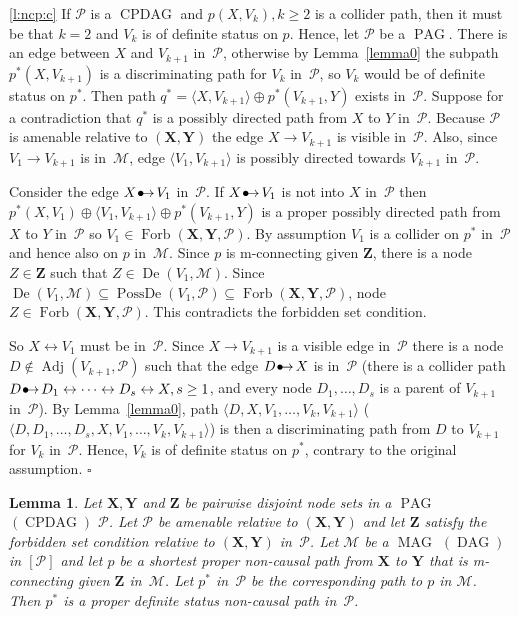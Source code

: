 \documentclass[11pt,a4paper]{article}
\newtheorem{lemma}[definition]{Lemma}
\newenvironment{proofof}[1][]{\begin{trivlist}
   \item[\hskip \labelsep {\bfseries Proof of #1.}]}{\hfill{}$\square$\end{trivlist}}
\DeclareMathOperator{\CPDAG}{CPDAG}
\DeclareMathOperator{\DAG}{DAG}
\DeclareMathOperator{\MAG}{MAG}
\DeclareMathOperator{\PAG}{PAG}
\DeclareMathOperator{\PossDe}{PossDe}
\DeclareMathOperator{\De}{De}
\DeclareMathOperator{\Adj}{Adj}
\DeclareMathOperator{\Forbi}{Forb}
\newcommand{\forb}{the forbidden set condition\xspace}
\newcommand{\g}[1][G]{\mathcal{#1}}
\newcommand{\fb}[2][X,Y]{\Forbi(\mathbf{#1},#2)}%
\newcommand{\pstar}[1][p]{{#1}^{*}}
\newcommand{\bulletarrow}{
  \setlength{\unitlength}{1mm}
  \begin{picture}(5,1)(0,0)
    \put(0.2,0){$\bullet$}
    \put(1,0){$\rightarrow$}
  \end{picture}
}
\begin{document}
\begin{proofof}[Lemma~\ref{lemma:non-causal path}]
\ref{l:ncp:c}  If $\g[P]$ is a $\CPDAG$ and $p(X,V_k), k \ge 2$ is a collider path, then it must be that $k=2$ and $V_k$ is of definite status on $p$. Hence, let $\g[P]$ be a $\PAG$. There is an edge between $X$ and $V_{k+1}$ in~$\g[P]$, otherwise by Lemma~\ref{lemma0} the subpath $\pstar(X,V_{k+1})$ is a discriminating path for $V_k$ in~$\g[P]$, so $V_k$ would be of definite status on $\pstar$. Then path $\pstar[q] = \langle X,V_{k+1} \rangle \oplus \pstar(V_{k+1},Y)$ exists in~$\g[P]$. 
Suppose for a contradiction that $\pstar[q]$ is a possibly directed path from $X$ to $Y$ in~$\g[P]$. Because $\g[P]$ is amenable relative to $(\mathbf{X,Y})$ the edge $X \rightarrow V_{k+1}$ is visible in~$\g[P]$. Also, since $V_1 \rightarrow V_{k+1}$ is in~$\g[M]$, edge $\langle V_1, V_{k+1} \rangle$ is possibly directed towards $V_{k+1}$ in~$\g[P]$.

Consider the edge $X \bulletarrow V_1$ in~$\g[P]$.
If $X \bulletarrow V_1$ is not into $X$ in~$\g[P]$ then $\pstar(X,V_1) \oplus \langle V_1,V_{k+1} \rangle \oplus \pstar(V_{k+1},Y)$ is a proper possibly directed path from $X$ to $Y$ in~$\g[P]$ so $V_1 \in \fb{\g[P]}$. By assumption $V_1$ is a collider on $\pstar$ in~$\g[P]$ and hence also on $p$ in~$\g[M]$. Since $p$ is m-connecting given $\mathbf{Z}$, there is a node $Z \in \mathbf{Z}$ such that $Z \in \De(V_1,\g[M])$. Since $ \De(V_1,\g[M]) \subseteq \PossDe(V_1,\g[P]) \subseteq \fb{\g[P]}$, node $Z \in \fb{\g[P]}$. This contradicts \forb.


So $X \leftrightarrow V_1$ must be in~$\g[P]$.
Since $X \rightarrow V_{k+1}$ is a visible edge in~$\g[P]$ there is a node $D \notin \Adj(V_{k+1},\g[P])$ such that the edge $D \bulletarrow X$ is in~$\g[P]$ (there is a collider path $D \bulletarrow D_1 \leftrightarrow \dots \leftrightarrow D_s \leftrightarrow X, s \ge 1$, and every node $D_1,\dots , D_s$ is a parent of $V_{k+1}$ in~$\g[P]$).
   By Lemma~\ref{lemma0}, path $\langle D,X, V_1, \dots , V_k,V_{k+1} \rangle$ ($\langle D, D_1, \dots ,D_s,X,V_1, \dots , V_k,V_{k+1} \rangle$) is then a discriminating path from $D$ to $V_{k+1}$ for $V_k$ in~$\g[P]$. Hence, $V_k$ is of definite status on $\pstar$, contrary to the original assumption.
\end{proofof}

\begin{lemma}
Let $\mathbf{X,Y}$ and $\mathbf{Z}$ be pairwise disjoint node sets in a $\PAG$ $(\CPDAG)$ $\g[P]$.  Let $\g[P]$ be amenable relative to $(\mathbf{X,Y})$ and let $\mathbf{Z}$ satisfy \forb{} relative to $(\mathbf{X},\mathbf{Y})$ in~$\g[P]$. Let $\g[M]$ be a $\MAG$ $(\DAG)$ in $[\g[P]]$ and let $p$ be a shortest proper non-causal path from $\mathbf{X}$ to $\mathbf{Y}$ that is m-connecting given $\mathbf{Z}$ in~$\g[M]$. Let $\pstar$ in~$\g[P]$ be the corresponding path to $p$ in $\g[M]$. Then $\pstar$ is a proper definite status non-causal path in~$\g[P]$.
   \label{lemma:1}
\end{lemma}
\end{document}
